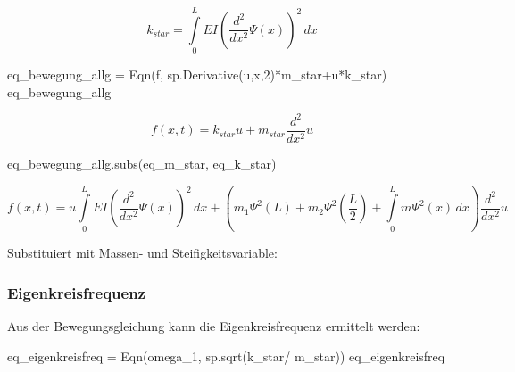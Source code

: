 \documentclass[
  letterpaper,
  DIV=11,
  numbers=noendperiod]{scrartcl}
\newenvironment{Shaded}{\begin{snugshade}}{\end{snugshade}}
\newcommand{\DecValTok}[1]{\textcolor[rgb]{0.68,0.00,0.00}{#1}}
\newcommand{\NormalTok}[1]{\textcolor[rgb]{0.00,0.23,0.31}{#1}}
\newcommand{\OperatorTok}[1]{\textcolor[rgb]{0.37,0.37,0.37}{#1}}
\begin{document}
\begin{equation}k_{star} = \int\limits_{0}^{L} E I \left(\frac{d^{2}}{d x^{2}} \Psi{\left(x \right)}\right)^{2}\, dx\end{equation}

\begin{Shaded}
\begin{Highlighting}[]
\NormalTok{eq\_bewegung\_allg }\OperatorTok{=}\NormalTok{ Eqn(f, sp.Derivative(u,x,}\DecValTok{2}\NormalTok{)}\OperatorTok{*}\NormalTok{m\_star}\OperatorTok{+}\NormalTok{u}\OperatorTok{*}\NormalTok{k\_star)}
\NormalTok{eq\_bewegung\_allg}
\end{Highlighting}
\end{Shaded}

\begin{equation}f{\left(x,t \right)} = k_{star} u + m_{star} \frac{d^{2}}{d x^{2}} u\end{equation}

\begin{Shaded}
\begin{Highlighting}[]
\NormalTok{eq\_bewegung\_allg.subs(eq\_m\_star, eq\_k\_star)}
\end{Highlighting}
\end{Shaded}

\begin{equation}f{\left(x,t \right)} = u \int\limits_{0}^{L} E I \left(\frac{d^{2}}{d x^{2}} \Psi{\left(x \right)}\right)^{2}\, dx + \left(m_{1} \Psi^{2}{\left(L \right)} + m_{2} \Psi^{2}{\left(\frac{L}{2} \right)} + \int\limits_{0}^{L} m \Psi^{2}{\left(x \right)}\, dx\right) \frac{d^{2}}{d x^{2}} u\end{equation}

Substituiert mit Massen- und Steifigkeitsvariable:

\hypertarget{eigenkreisfrequenz}{%
\subsubsection{Eigenkreisfrequenz}\label{eigenkreisfrequenz}}

Aus der Bewegungsgleichung kann die Eigenkreisfrequenz ermittelt werden:

\begin{Shaded}
\begin{Highlighting}[]
\NormalTok{eq\_eigenkreisfreq }\OperatorTok{=}\NormalTok{ Eqn(omega\_1, sp.sqrt(k\_star}\OperatorTok{/}\NormalTok{ m\_star))}
\NormalTok{eq\_eigenkreisfreq}
\end{Highlighting}
\end{Shaded}
\end{document}
